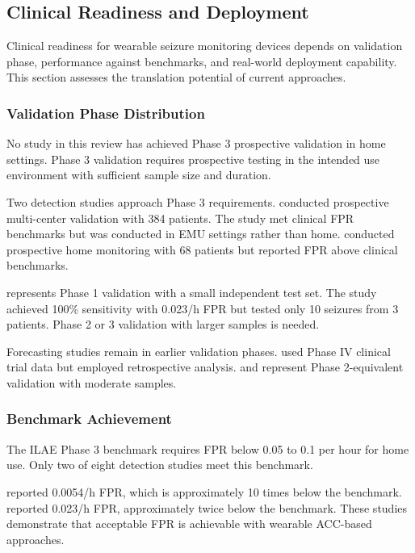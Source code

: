 \subsection{Clinical Readiness and Deployment}

Clinical readiness for wearable seizure monitoring devices depends on validation phase, performance against benchmarks, and real-world deployment capability. This section assesses the translation potential of current approaches.

\subsubsection{Validation Phase Distribution}

No study in this review has achieved Phase 3 prospective validation in home settings. Phase 3 validation requires prospective testing in the intended use environment with sufficient sample size and duration.

Two detection studies approach Phase 3 requirements. \textcite{spahrDeepLearningbasedDetection2025} conducted prospective multi-center validation with 384 patients. The study met clinical FPR benchmarks but was conducted in EMU settings rather than home. \textcite{dongTwoLayerEnsembleMethod2022} conducted prospective home monitoring with 68 patients but reported FPR above clinical benchmarks.

\textcite{fineDetectionKeyAutomated2025} represents Phase 1 validation with a small independent test set. The study achieved 100\% sensitivity with 0.023/h FPR but tested only 10 seizures from 3 patients. Phase 2 or 3 validation with larger samples is needed.

Forecasting studies remain in earlier validation phases. \textcite{vielufSeizureMonitoringCombined2025} used Phase IV clinical trial data but employed retrospective analysis. \textcite{meiselMachineLearningWristband2020} and \textcite{nasseriAmbulatorySeizureForecasting2021} represent Phase 2-equivalent validation with moderate samples.

\subsubsection{Benchmark Achievement}

The ILAE Phase 3 benchmark requires FPR below 0.05 to 0.1 per hour for home use. Only two of eight detection studies meet this benchmark.

\textcite{spahrDeepLearningbasedDetection2025} reported 0.0054/h FPR, which is approximately 10 times below the benchmark. \textcite{fineDetectionKeyAutomated2025} reported 0.023/h FPR, approximately twice below the benchmark. These studies demonstrate that acceptable FPR is achievable with wearable ACC-based approaches.

